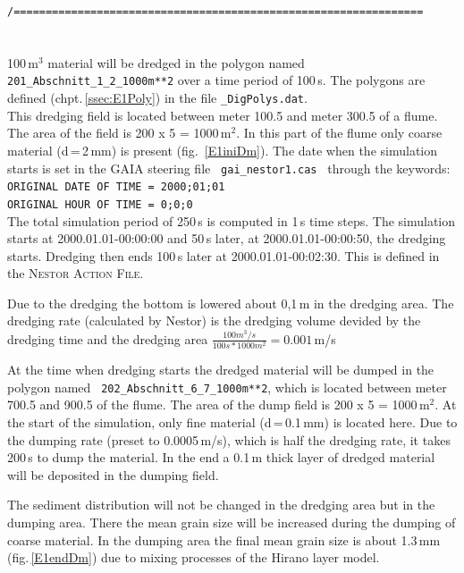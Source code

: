 \hspace*{3mm} \texttt{\small{/================================================================}}\\
\\
\\
100\,m$^3$ material will be dredged in the polygon named \texttt{201\_Abschnitt\_1\_2\_1000m**2} over a time period of 100\,s.
The polygons are defined (chpt.\,\ref{ssec:E1Poly}) in the file \texttt{\_DigPolys.dat}.\\
This dredging field is located between meter 100.5 and meter 300.5 of a flume. The area of the field is 200 x 5
= 1000\,m$^2$. In this part of the flume only coarse material (d\,=\,2\,mm) is present (fig.~\ref{E1iniDm}).
The date when the simulation starts is set in the GAIA steering file
\texttt{~gai\_nestor1.cas~} through the keywords:\\
\texttt{ORIGINAL DATE OF TIME = 2000;01;01}\\
\texttt{ORIGINAL HOUR OF TIME = 0;0;0}\\
The total simulation period of 250\,s is computed in 1\,s time steps.
The simulation starts at 2000.01.01-00:00:00 and 50\,s later, at 2000.01.01-00:00:50, the dredging starts.
Dredging then ends 100\,s later at 2000.01.01-00:02:30.
This is defined in the \textsc{Nestor Action File}.

Due to the dredging the bottom is lowered about 0,1\,m in the dredging area.
The dredging rate (calculated by Nestor) is the dredging volume devided by the dredging time and the dredging area
$\frac{100 m^3/s}{100 s*1000 m^2}=0.001$\,m/s

At the time when dredging starts the dredged material will
be dumped in the polygon named \texttt{~202\_Abschnitt\_6\_7\_1000m**2}, which is located between meter 700.5 and 900.5 of the flume.
The area of the dump field is 200 x 5 = 1000\,m$^2$.
At the start of the simulation, only fine material (d\,=\,0.1\,mm) is located here.
Due to the dumping rate (preset to 0.0005\,m/s), which is half the dredging rate, it takes 200\,s to dump the material.
In the end a 0.1\,m thick layer of dredged material will be deposited in the dumping field.

The sediment distribution will not be changed in the dredging area but in the dumping area.
There the mean grain size will be increased during the dumping of coarse material.
In the dumping area the final mean grain size is about 1.3\,mm (fig.\,\ref{E1endDm}) due to mixing processes of the Hirano layer model.




